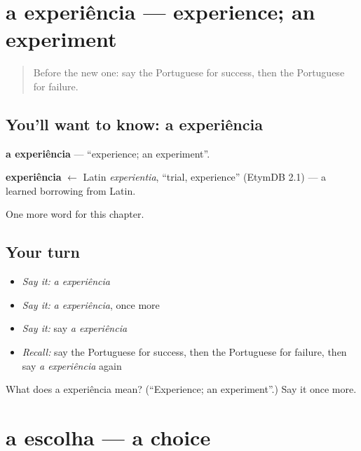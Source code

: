 \section[a experiência]{a experiência — experience; an experiment}

\label{lesson:PT-C247-experiencia}



\begin{quote}
Before the new one: say the Portuguese for success, then the Portuguese for failure.
\end{quote}

\subsection*{You'll want to know: a experiência}
\textbf{a experiência} — \textquotedblleft{}experience; an experiment\textquotedblright{}.

\begin{cousinweb}
\textbf{experiência} $\leftarrow$ Latin \emph{experientia}, \textquotedblleft{}trial, experience\textquotedblright{} (EtymDB 2.1) — a learned borrowing from Latin.
\end{cousinweb}

\begin{grammarlens}[title={What you've built}]
One more word for this chapter.
\end{grammarlens}

\subsection*{Your turn}
\begin{itemize}
\raggedright
  \item \emph{Say it:} \emph{a experiência}
  \item \emph{Say it:} \emph{a experiência}, once more
  \item \emph{Say it:} say \emph{a experiência}
  \item \emph{Recall:} say the Portuguese for success, then the Portuguese for failure, then say \emph{a experiência} again
\end{itemize}

\begin{tcolorbox}[breakable,colback=teal!4,colframe=teal!35!black,title={Before you move on}]
What does a experiência mean? (\textquotedblleft{}Experience; an experiment\textquotedblright{}.) Say it once more.
\end{tcolorbox}
\section[a escolha]{a escolha — a choice}

